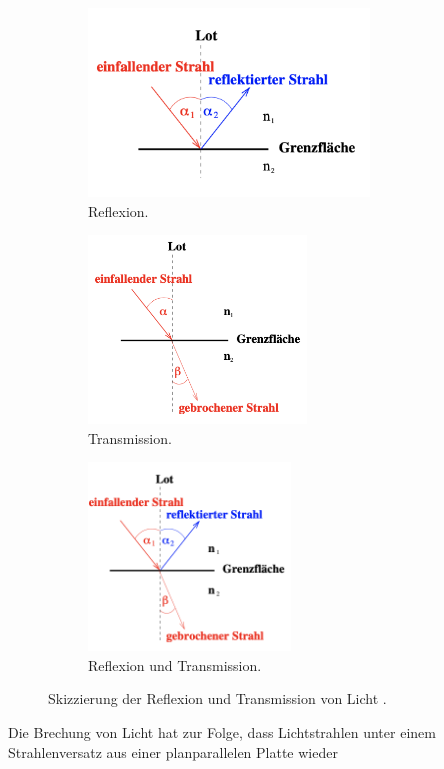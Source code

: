 \begin{figure}[H]
    \begin{subfigure}{0.31\textwidth}
      \centering
      \includegraphics[height=5cm]{content/pics/Reflexion.png}
      \caption{Reflexion.}
    \end{subfigure}
    \hfill
    \begin{subfigure}{0.31\textwidth}
      \centering
      \includegraphics[height=5cm]{content/pics/Brechung.png}
      \caption{Transmission.}
    \end{subfigure}
    \begin{subfigure}{0.31\textwidth}
        \centering
        \includegraphics[height=5cm]{content/pics/Reflexion_Brechung.png}
        \caption{Reflexion und Transmission.}
      \end{subfigure}
    \caption{Skizzierung der Reflexion und Transmission von Licht \cite{v400}.}
    \label{fig:Brechungstypen}
  \end{figure}
Die Brechung von Licht hat zur Folge, dass Lichtstrahlen unter einem Strahlenversatz aus einer planparallelen Platte wieder 
